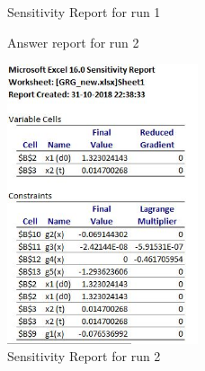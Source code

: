 \documentclass[12pt]{article}
\begin{document}
\begin{enumerate}[I]
\begin{enumerate}[1)]
\begin{figure}[!htbp]
  \caption{Sensitivity Report for run 1}
\end{figure}
\begin{figure}[!htbp]
    \caption{Answer report for run 2}
\end{figure}
\begin{figure}[!htbp]
  \centering
    \includegraphics[width=0.5\textwidth]{sens2.JPG}
  \caption{Sensitivity Report for run 2}
\end{figure}


\end{enumerate}
\end{enumerate}
\end{document}
